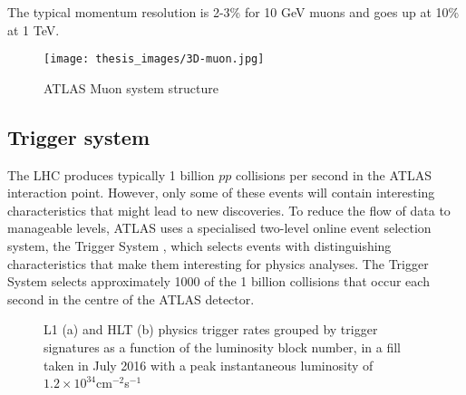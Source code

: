 \documentclass[a4paper, oneside, 11pt, openright]{book}
\begin{document}
				The typical momentum resolution is 2-3\% for 10 GeV muons and goes up at 10\% at 1 TeV.
				\begin{figure}
					\centering
					\texttt{[image: thesis\_images/3D-muon.jpg]}
					\caption{ATLAS Muon system structure}
					\label{fig:muon detector}
				\end{figure}
			
			\subsection{Trigger system}
				The LHC produces typically 1 billion $pp$ collisions per second in the ATLAS interaction point. However, only some of these events will contain interesting characteristics that might lead to new discoveries. To reduce the flow of data to manageable levels, ATLAS uses a specialised two-level online event selection system, the Trigger System \cite{L1_trigger,HLT_trigger}, which selects events with distinguishing characteristics that make them interesting for physics analyses. The Trigger System selects approximately 1000 of the 1 billion collisions that occur each second in the centre of the ATLAS detector. 
				
				\begin{figure}
					\centering
					\caption{L1 (a) and HLT (b) physics trigger rates grouped by trigger signatures as a function of the luminosity block number, in a fill taken in July 2016 with a peak instantaneous luminosity of $1.2 \times 10^{34}$cm$^{-2}$s$^{-1}$}
					\label{fig:Trigger system}
				\end{figure}
				
\end{document}
